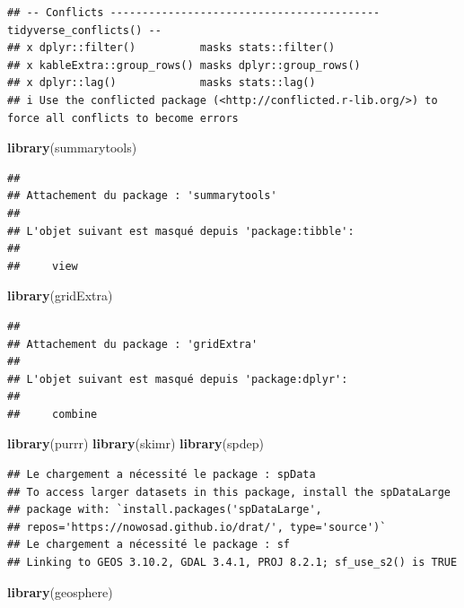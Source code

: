 \documentclass[
]{article}
\newenvironment{Shaded}{\begin{snugshade}}{\end{snugshade}}
\newcommand{\FunctionTok}[1]{\textcolor[rgb]{0.13,0.29,0.53}{\textbf{#1}}}
\newcommand{\NormalTok}[1]{#1}
\begin{document}
\begin{verbatim}
## -- Conflicts ------------------------------------------ tidyverse_conflicts() --
## x dplyr::filter()          masks stats::filter()
## x kableExtra::group_rows() masks dplyr::group_rows()
## x dplyr::lag()             masks stats::lag()
## i Use the conflicted package (<http://conflicted.r-lib.org/>) to force all conflicts to become errors
\end{verbatim}

\begin{Shaded}
\begin{Highlighting}[]
\FunctionTok{library}\NormalTok{(summarytools)}
\end{Highlighting}
\end{Shaded}

\begin{verbatim}
## 
## Attachement du package : 'summarytools'
## 
## L'objet suivant est masqué depuis 'package:tibble':
## 
##     view
\end{verbatim}

\begin{Shaded}
\begin{Highlighting}[]
\FunctionTok{library}\NormalTok{(gridExtra)}
\end{Highlighting}
\end{Shaded}

\begin{verbatim}
## 
## Attachement du package : 'gridExtra'
## 
## L'objet suivant est masqué depuis 'package:dplyr':
## 
##     combine
\end{verbatim}

\begin{Shaded}
\begin{Highlighting}[]
\FunctionTok{library}\NormalTok{(purrr)}
\FunctionTok{library}\NormalTok{(skimr)}
\FunctionTok{library}\NormalTok{(spdep)}
\end{Highlighting}
\end{Shaded}

\begin{verbatim}
## Le chargement a nécessité le package : spData
## To access larger datasets in this package, install the spDataLarge
## package with: `install.packages('spDataLarge',
## repos='https://nowosad.github.io/drat/', type='source')`
## Le chargement a nécessité le package : sf
## Linking to GEOS 3.10.2, GDAL 3.4.1, PROJ 8.2.1; sf_use_s2() is TRUE
\end{verbatim}

\begin{Shaded}
\begin{Highlighting}[]
\FunctionTok{library}\NormalTok{(geosphere)}
\end{Highlighting}
\end{Shaded}
\end{document}
